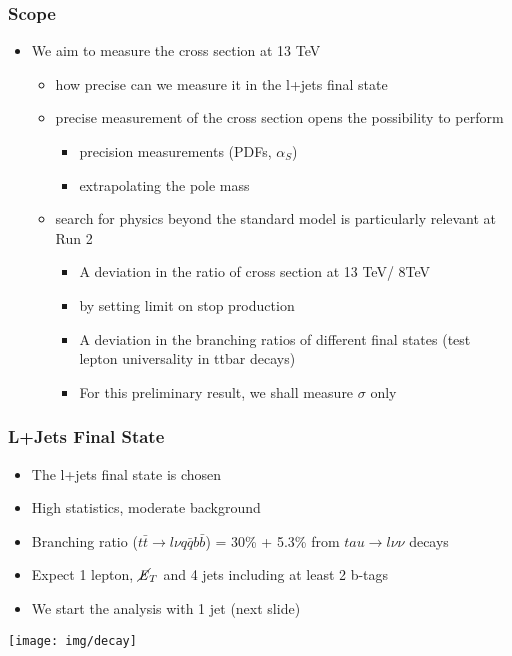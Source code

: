 \documentclass{beamer}
\begin{document}
\begin{frame}
\frametitle{Scope}
\begin{itemize}
\item We aim to measure the cross section at 13 TeV
\begin{itemize}
\item how precise can we measure it in the l+jets final state
\item precise measurement of the cross section opens the possibility to perform
\begin{itemize}
\item precision measurements (PDFs, $\alpha_S$)
\item extrapolating the pole mass \href {http://arxiv.org/abs/1511.00841}{}
\end{itemize}
\end{itemize}
\begin{itemize}
\item search for physics beyond the standard model is particularly relevant at Run 2
\begin{itemize}
\item A deviation in the ratio of cross section at 13 TeV/ 8TeV \href {http://arxiv.org/abs/1206.3557}{}
\item by setting limit on stop production \href {http://arxiv.org/abs/1407.1043}{}
\item A deviation in the branching ratios of different final states (test lepton universality in ttbar decays) 
\item For this preliminary result, we shall measure $\sigma$ only
\end{itemize}
\end{itemize}
\end{itemize}
\end{frame}
\begin{frame}
\frametitle{L+Jets Final State}
\begin{itemize}
\item The l+jets final state is chosen
\item High statistics, moderate background
\item Branching ratio ($t\bar{t} \rightarrow l\nu q\bar{q} b\bar{b}$) = 30\% + 5.3\% from $tau \rightarrow l\nu\nu$ decays
\item Expect 1 lepton, $\cancel{\it{E}}_{T}$ and 4 jets including at least 2 b-tags
\item We start the analysis with 1 jet (next slide)
\end{itemize}
\begin{center}
 \texttt{[image: img/decay]}
\end{center}
\end{frame}
\end{document}

